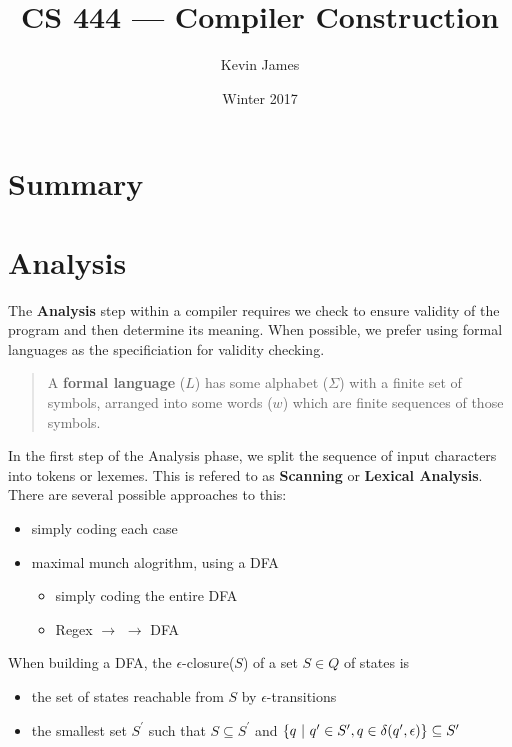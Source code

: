\documentclass[12pt]{article}
\begin{document}
\title{CS 444 --- Compiler Construction}
\author{Kevin James}
\date{\vspace{-2ex}Winter 2017}
\maketitle\HRule

\tableofcontents
\newpage

\section{Summary}

\section{Analysis}
The {\bf Analysis} step within a compiler requires we check to ensure validity of the program and then determine its meaning. When possible, we prefer using formal languages as the specificiation for validity checking.

\begin{quote}
A {\bf formal language} ($L$) has some alphabet ($\Sigma$) with a finite set of symbols, arranged into some words ($w$) which are finite sequences of those symbols.
\end{quote}

In the first step of the Analysis phase, we split the sequence of input characters into tokens or lexemes. This is refered to as {\bf Scanning} or {\bf Lexical Analysis}. There are several possible approaches to this:
\begin{itemize}
    \item simply coding each case
    \item maximal munch alogrithm, using a DFA
    \begin{itemize}
        \item simply coding the entire DFA
        \item Regex $\to$  $\to$ DFA
    \end{itemize}
\end{itemize}

When building a DFA, the $\epsilon$-closure($S$) of a set $S \in Q$ of states is
\begin{itemize}
    \item the set of states reachable from $S$ by $\epsilon$-transitions
    \item the smallest set $S^\prime$ such that $S \subseteq S^\prime$ and $\{q \ |\  q^\prime \in S^\prime, q \in \delta(q^\prime, \epsilon)\} \subseteq S^\prime$
\end{itemize}
\end{document}
